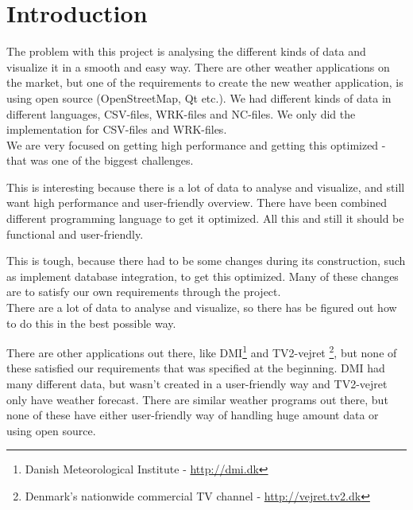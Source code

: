 \chapter{Introduction}
\label{sec:introduction}



The problem with this project is analysing the different kinds of data and visualize it in a smooth and easy way. There are other weather applications on the market, but one of the requirements to create the new weather application, is using open source (OpenStreetMap, Qt etc.). We had different kinds of data in different languages, CSV-files, WRK-files and NC-files. We only did the implementation for CSV-files and WRK-files.\\
We are very focused on getting high performance and getting this optimized - that was one of the biggest challenges.

This is interesting because there is a lot of data to analyse and visualize, and still want high performance and user-friendly overview. There have been combined different programming language to get it optimized. All this and still it should be functional and user-friendly.

This is tough, because there had to be some changes during its construction, such as implement database integration, to get this optimized. Many of these changes are to satisfy our own requirements through the project.\\
There are a lot of data to analyse and visualize, so there has be figured out how to do this in the best possible way.

There are other applications out there, like DMI\footnote{Danish Meteorological Institute - \url{http://dmi.dk}} and TV2-vejret \footnote{Denmark's nationwide commercial TV channel - \url{http://vejret.tv2.dk}}, but none of these satisfied our requirements that was specified at the beginning. DMI had many different data, but wasn't created in a user-friendly way and TV2-vejret only have weather forecast. There are similar weather programs out there, but none of these have either user-friendly way of handling huge amount data or using open source.


